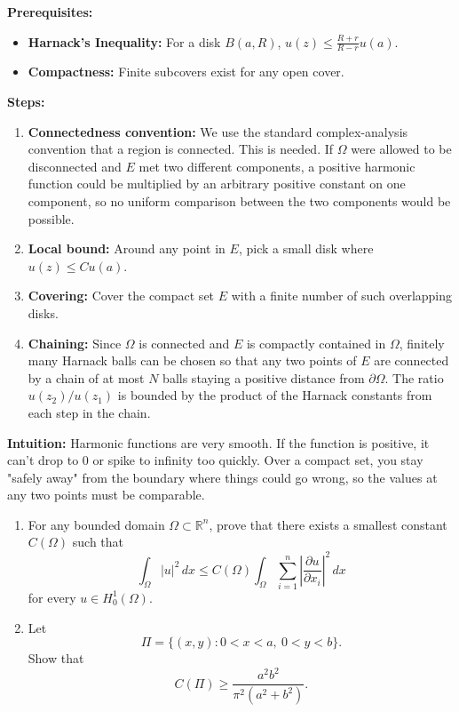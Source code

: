 \begin{solution}
\textbf{Prerequisites:}
\begin{itemize}
    \item \textbf{Harnack's Inequality:} For a disk $B(a, R)$, $u(z) \leq \frac{R+r}{R-r} u(a)$.
    \item \textbf{Compactness:} Finite subcovers exist for any open cover.
\end{itemize}

\textbf{Steps:}
\begin{enumerate}
    \item \textbf{Connectedness convention:} We use the standard complex-analysis convention that a region is connected. This is needed. If $\Omega$ were allowed to be disconnected and $E$ met two different components, a positive harmonic function could be multiplied by an arbitrary positive constant on one component, so no uniform comparison between the two components would be possible.
    \item \textbf{Local bound:} Around any point in $E$, pick a small disk where $u(z) \leq C u(a)$.
    \item \textbf{Covering:} Cover the compact set $E$ with a finite number of such overlapping disks.
    \item \textbf{Chaining:} Since $\Omega$ is connected and $E$ is compactly contained in $\Omega$, finitely many Harnack balls can be chosen so that any two points of $E$ are connected by a chain of at most $N$ balls staying a positive distance from $\partial\Omega$. The ratio $u(z_2)/u(z_1)$ is bounded by the product of the Harnack constants from each step in the chain.
\end{enumerate}

\textbf{Intuition:}
Harmonic functions are very smooth. If the function is positive, it can't drop to 0 or spike to infinity too quickly. Over a compact set, you stay "safely away" from the boundary where things could go wrong, so the values at any two points must be comparable.
\end{solution}

\begin{exercise}
\label{analysis:2017:6}
\begin{enumerate}
\item For any bounded domain $\Omega\subset\mathbb{R}^n$, prove that there exists a smallest constant $C(\Omega)$ such that
\[
\int_{\Omega}|u|^2\,dx
\leq C(\Omega)\int_{\Omega}\sum_{i=1}^n
\left|\frac{\partial u}{\partial x_i}\right|^2\,dx
\]
for every $u\in H_0^1(\Omega)$.
\item Let
\[
\Pi=\{(x,y):0<x<a,\ 0<y<b\}.
\]
Show that
\[
C(\Pi)\geq \frac{a^2b^2}{\pi^2(a^2+b^2)}.
\]
\end{enumerate}
\end{exercise}

